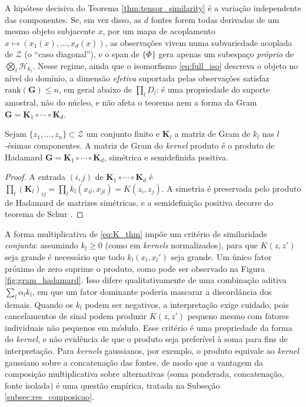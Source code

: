 \begin{remark}\label{rem:diagonal_case}
A hipótese decisiva do Teorema \ref{thm:tensor_similarity} é a variação independente das componentes. Se, em vez disso, as $d$ fontes forem todas derivadas de um mesmo objeto subjacente $x$, por um mapa de acoplamento $x \mapsto (x_1(x), \dots, x_d(x))$, as observações vivem numa subvariedade acoplada de $\mathcal{Z}$ (o ``caso diagonal''), e o span de $\{\Phi\}$ gera apenas um subespaço \emph{próprio} de $\bigotimes_l \mathcal{H}_{k_l}$. Nesse regime, ainda que o isomorfismo \eqref{eq:full_iso} descreva o objeto no nível do domínio, a dimensão \emph{efetiva} suportada pelas observações satisfaz $\mathrm{rank}(\mathbf{G}) \leq n$, em geral abaixo de $\prod_l D_l$: é uma propriedade do suporte amostral, não do núcleo, e não afeta o teorema nem a forma da Gram $\mathbf{G} = \mathbf{K}_1 \circ \cdots \circ \mathbf{K}_d$.
\end{remark}
 
\begin{corollary}\label{cor:hadamard_form}
Sejam $\{z_1, \dots, z_n\} \subset \mathcal{Z}$ um conjunto finito e $\mathbf{K}_l$ a matriz de Gram de $k_l$ nas $l$-ésimas componentes. A matriz de Gram do \textit{kernel} produto é o produto de Hadamard $\mathbf{G} = \mathbf{K}_1 \circ \cdots \circ \mathbf{K}_d$, simétrica e semidefinida positiva.
\end{corollary}
 
\begin{proof}
A entrada $(i,j)$ de $\mathbf{K}_1 \circ \cdots \circ \mathbf{K}_d$ é $\prod_l (\mathbf{K}_l)_{ij} = \prod_l k_l(x_{il}, x_{jl}) = K(z_i, z_j)$. A simetria é preservada pelo produto de Hadamard de matrizes simétricas, e a semidefinição positiva decorre do teorema de Schur \citep{Schur1911, HornJohnson2013}.
\end{proof}
 

\begin{remark}\label{rem:joint_similarity}
A forma multiplicativa de \eqref{eq:K_thm} impõe um critério de similaridade \emph{conjunta}: assumindo $k_l \geq 0$ (como em \textit{kernels} normalizados), para que $K(z, z')$ seja grande é necessário que todo $k_l(x_l, x_l')$ seja grande. Um único fator próximo de zero suprime o produto, como pode ser observado na Figura \ref{fig:gram_hadamard}. Isso difere qualitativamente de uma combinação aditiva $\sum_l \alpha_l k_l$, em que um fator dominante poderia mascarar a discordância dos demais. Quando os $k_l$ podem ser negativos, a interpretação exige cuidado, pois cancelamentos de sinal podem produzir $K(z,z')$ pequeno mesmo com fatores individuais não pequenos em módulo. Esse critério é uma propriedade da forma do \textit{kernel}, e não evidência de que o produto seja preferível à soma para fins de interpretação. Para \textit{kernels} gaussianos, por exemplo, o produto equivale ao \textit{kernel} gaussiano sobre a concatenação das fontes, de modo que a vantagem da composição multiplicativa sobre alternativas (soma ponderada, concatenação, fonte isolada) é uma questão empírica, tratada na Subseção \ref{subsec:res_composicao}.
\end{remark}

